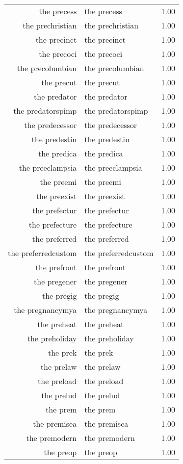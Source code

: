 \begin{table}[ht]
\begin{tabular}{rlr}
  the precess & the precess & 1.00 \\ 
  the prechristian & the prechristian & 1.00 \\ 
  the precinct & the precinct & 1.00 \\ 
  the precoci & the precoci & 1.00 \\ 
  the precolumbian & the precolumbian & 1.00 \\ 
  the precut & the precut & 1.00 \\ 
  the predator & the predator & 1.00 \\ 
  the predatorspimp & the predatorspimp & 1.00 \\ 
  the predecessor & the predecessor & 1.00 \\ 
  the predestin & the predestin & 1.00 \\ 
  the predica & the predica & 1.00 \\ 
  the preeclampsia & the preeclampsia & 1.00 \\ 
  the preemi & the preemi & 1.00 \\ 
  the preexist & the preexist & 1.00 \\ 
  the prefectur & the prefectur & 1.00 \\ 
  the prefecture & the prefecture & 1.00 \\ 
  the preferred & the preferred & 1.00 \\ 
  the preferredcustom & the preferredcustom & 1.00 \\ 
  the prefront & the prefront & 1.00 \\ 
  the pregener & the pregener & 1.00 \\ 
  the pregig & the pregig & 1.00 \\ 
  the pregnancymya & the pregnancymya & 1.00 \\ 
  the preheat & the preheat & 1.00 \\ 
  the preholiday & the preholiday & 1.00 \\ 
  the prek & the prek & 1.00 \\ 
  the prelaw & the prelaw & 1.00 \\ 
  the preload & the preload & 1.00 \\ 
  the prelud & the prelud & 1.00 \\ 
  the prem & the prem & 1.00 \\ 
  the premisea & the premisea & 1.00 \\ 
  the premodern & the premodern & 1.00 \\ 
  the preop & the preop & 1.00 \\ 

\end{tabular}
\end{table}
